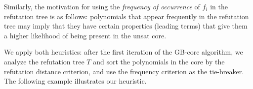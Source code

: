 Similarly, the motivation for using the \emph{frequency of occurrence}
of $f_i$ in the refutation tree is as follows: polynomials that appear
frequently in the refutation tree may imply that they have certain
properties (leading terms) that give them a higher likelihood of being
present in the unsat core. 


We apply both heuristics: after the first iteration of the GB-core
algorithm, we analyze the refutation tree $T$ and sort the polynomials
in the core by the refutation distance criterion, and use the
frequency criterion as the tie-breaker. The following example
illustrates our heuristic.  


